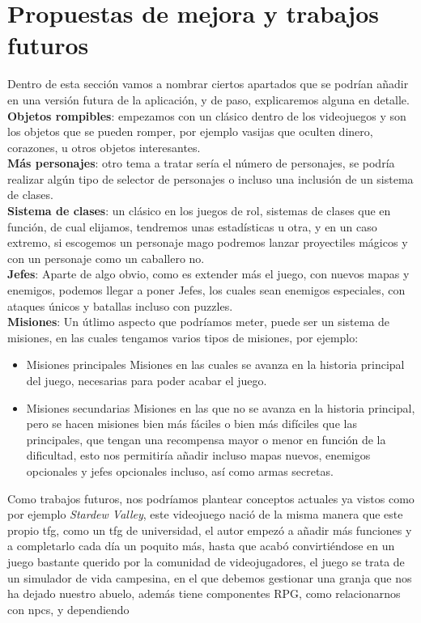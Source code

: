 \documentclass[a4paper]{article}
\begin{document}
\section{Propuestas de mejora y trabajos futuros}
Dentro de esta sección vamos a nombrar ciertos apartados que se podrían añadir en una versión futura de la aplicación, y de paso, explicaremos alguna en detalle.\\
\textbf{Objetos rompibles}: empezamos con un clásico dentro de los videojuegos y son los objetos que se pueden romper, por ejemplo vasijas que oculten dinero, corazones, u otros objetos interesantes.\\
\textbf{Más personajes}: otro tema a tratar sería el número de personajes, se podría realizar algún tipo de selector de personajes o incluso una inclusión de un sistema de clases.\\
\textbf{Sistema de clases}: un clásico en los juegos de rol, sistemas de clases que en función, de cual elijamos, tendremos unas estadísticas u otra, y en un caso extremo, si escogemos un personaje mago podremos lanzar proyectiles mágicos y con un personaje como un caballero no.\\
\textbf{Jefes}: Aparte de algo obvio, como es extender más el juego, con nuevos mapas y enemigos, podemos llegar a poner Jefes, los cuales sean enemigos especiales, con ataques únicos y batallas incluso con puzzles.\\
\textbf{Misiones}: Un útlimo aspecto que podríamos meter, puede ser un sistema de misiones, en las cuales tengamos varios tipos de misiones, por ejemplo:
\begin{itemize}
    \item Misiones principales
    Misiones en las cuales se avanza en la historia principal del juego, necesarias para poder acabar el juego.
    \item Misiones secundarias
    Misiones en las que no se avanza en la historia principal, pero se hacen misiones bien más fáciles o bien más difíciles que las principales, que tengan una recompensa mayor o menor en función de la dificultad, esto nos permitiría añadir incluso mapas nuevos, enemigos opcionales y jefes opcionales incluso, así como armas secretas.
\end{itemize}
Como trabajos futuros, nos podríamos plantear conceptos actuales ya vistos como por ejemplo \textit{Stardew Valley}, este videojuego nació de la misma manera que este propio tfg, como un tfg de universidad, el autor empezó a añadir más funciones y a completarlo cada día un poquito más,
hasta que acabó convirtiéndose en un juego bastante querido por la comunidad de videojugadores, el juego se trata de un simulador de vida campesina, en el que debemos gestionar una granja que nos ha dejado nuestro abuelo, además tiene componentes RPG, como relacionarnos con npcs, y dependiendo
\end{document}
